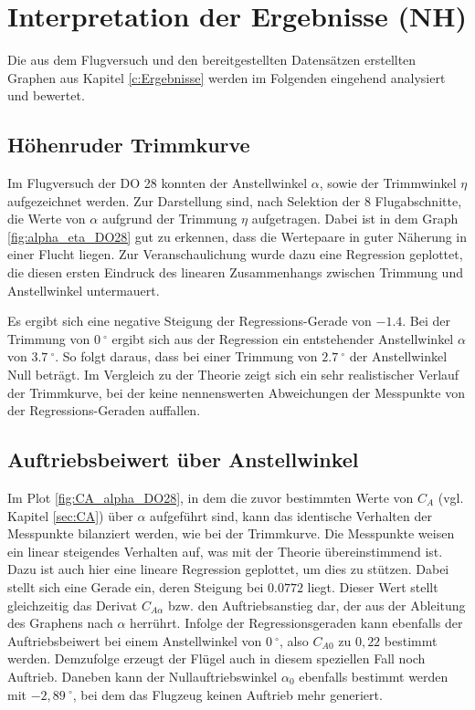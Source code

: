 \chapter{Interpretation der Ergebnisse (NH)}

Die aus dem Flugversuch und den bereitgestellten Datensätzen erstellten Graphen aus Kapitel \ref{c:Ergebnisse} werden im Folgenden eingehend analysiert und bewertet.

\section{Höhenruder Trimmkurve}

Im Flugversuch der DO 28 konnten der Anstellwinkel $\alpha$, sowie der Trimmwinkel $\eta$ aufgezeichnet werden. Zur Darstellung sind, nach Selektion der 8 Flugabschnitte, die Werte von $\alpha$ aufgrund der Trimmung $\eta$ aufgetragen. Dabei ist in dem Graph \ref{fig:alpha_eta_DO28} gut zu erkennen, dass die Wertepaare in guter Näherung in einer Flucht liegen. Zur Veranschaulichung wurde dazu eine Regression geplottet, die diesen ersten Eindruck des linearen Zusammenhangs zwischen Trimmung und Anstellwinkel untermauert.  

Es ergibt sich eine negative Steigung der Regressions-Gerade von $-1.4$. Bei der Trimmung von $0 \ ^{\circ}$ ergibt sich aus der Regression ein entstehender Anstellwinkel $\alpha$ von $3.7 \ ^{\circ}$. So folgt daraus, dass bei einer Trimmung von $2.7 \ ^{\circ}$ der Anstellwinkel Null beträgt. Im Vergleich zu der Theorie zeigt sich ein sehr realistischer Verlauf der Trimmkurve, bei der keine nennenswerten Abweichungen der Messpunkte von der Regressions-Geraden auffallen.

\section{Auftriebsbeiwert über Anstellwinkel}

Im Plot \ref{fig:CA_alpha_DO28}, in dem die zuvor bestimmten Werte von $C_A$ (vgl. Kapitel \ref{sec:CA}) über $\alpha$ aufgeführt sind, kann das identische Verhalten der Messpunkte bilanziert werden, wie bei der Trimmkurve. Die Messpunkte weisen ein linear steigendes Verhalten auf, was mit der Theorie übereinstimmend ist. Dazu ist auch hier eine lineare Regression geplottet, um dies zu stützen. Dabei stellt sich eine Gerade ein, deren Steigung bei $0.0772$ liegt. Dieser Wert stellt gleichzeitig das Derivat $C_{A\alpha}$ bzw. den Auftriebsanstieg dar, der aus der Ableitung des Graphens nach $\alpha$ herrührt. Infolge der Regressionsgeraden kann ebenfalls der Auftriebsbeiwert bei einem Anstellwinkel von $0 \ ^{\circ}$, also $C_{A0}$ zu $0,22$ bestimmt werden. Demzufolge erzeugt der Flügel auch in diesem speziellen Fall noch Auftrieb.
Daneben kann der Nullauftriebswinkel $\alpha_0$ ebenfalls bestimmt werden mit $-2,89\ ^{\circ}$, bei dem das Flugzeug keinen Auftrieb mehr generiert.

